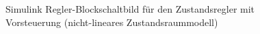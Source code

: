 \begin{figure}[H]
    \centering
    \caption[Zustandsregler mit Vorsteuerung Simulink (nicht-linear)]{Simulink Regler-Blockschaltbild für den Zustandsregler mit Vorsteuerung (nicht-lineares Zustandsraummodell)}
    \label{fig:Bild22}
\end{figure}

